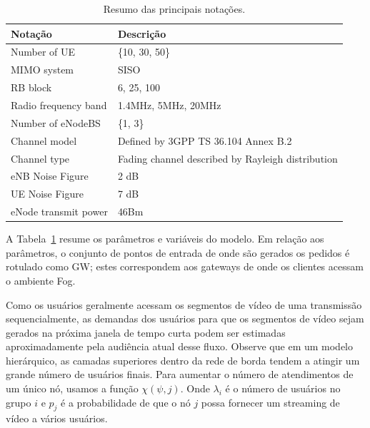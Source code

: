 \begin{table}[h!]
\centering
\begin{tabular}{|l|l|}
\hline
\multicolumn{1}{|l|}{\textbf{Notação}} & \multicolumn{1}{l|}{\textbf{Descrição}} \\ \hline \hline
Number of UE                    & \{10, 30, 50\}                      \\
\hline
MIMO system                     & SISO                                \\
\hline
RB block                        &  6, 25, 100                         \\
\hline
Radio frequency band            & 1.4MHz, 5MHz, 20MHz                 \\
\hline
Number of eNodeBS               & \{1, 3\}                            \\
\hline
Channel model                   & Defined by 3GPP TS 36.104 Annex B.2 \\
\hline
Channel type                    & Fading channel described  by Rayleigh distribution \\
\hline
eNB  Noise Figure               & 2 dB                                \\
\hline
UE Noise Figure                 & 7 dB                                \\  
\hline
eNode transmit power            & 46Bm                                \\
\hline
\end{tabular}
\caption{Resumo das principais notações.}
\label{tb:resu-notation}

\end{table}


A Tabela~\ref{tb:resu-notation} resume os parâmetros e variáveis do modelo. Em relação aos parâmetros, o conjunto de pontos de entrada de onde são gerados os pedidos é rotulado como GW; estes correspondem aos gateways de onde os clientes acessam o ambiente Fog.

Como os usuários geralmente acessam os segmentos de vídeo de uma transmissão sequencialmente, as demandas dos usuários para que os segmentos de vídeo sejam gerados na próxima janela de tempo curta podem ser estimadas aproximadamente pela audiência atual desse fluxo. Observe que em um modelo hierárquico, as camadas superiores dentro da rede de borda tendem a atingir um grande número de usuários finais.
Para aumentar o número de atendimentos de um único nó, usamos a função $\chi(\psi, j)$. Onde $\lambda_{i}$ é o número de usuários no grupo $i$ e $p_{j}$ é a probabilidade de que o nó $j$ possa fornecer um streaming de vídeo a vários usuários.

